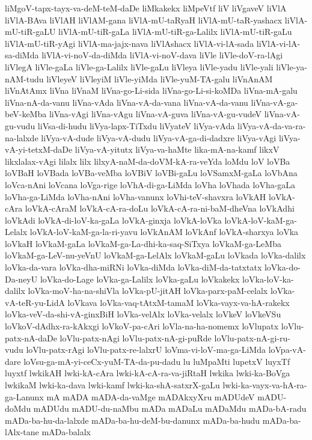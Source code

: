 {liMgoV-tapx-tayx-va-deM-teM-daDe
liMkakekx
liMpeVtf
liV
liVgaveV
liVlA
liVlA-BAva
liVlAH
liVlAM-gana
liVlA-mU-taRyaH
liVlA-mU-taR-yashacx
liVlA-mU-tiR-gaLU
liVlA-mU-tiR-gaLa
liVlA-mU-tiR-ga-Lalilx
liVlA-mU-tiR-gaLu
liVlA-mU-tiR-yAgi
liVlA-ma-jajx-nava
liVlAshacx
liVlA-vi-lA-sada
liVlA-vi-lA-sa-diMda
liVlA-vi-noV-da-diMda
liVlA-vi-noV-dava
liVle
liVle-doV-ra-lAgi
liVlegA
liVle-gaLa
liVle-ga-Lalilx
liVle-gaLu
liVleya
liVle-yadu
liVle-yali
liVle-ya-nAM-tudu
liVleyeV
liVleyiM
liVle-yiMda
liVle-yuM-TA-galu
liVnAnAM
liVnAtAmx
liVna
liVnaM
liVna-go-Li-sida
liVna-go-Li-si-koMDa
liVna-mA-galu
liVna-nA-da-vanu
liVna-vAda
liVna-vA-da-vana
liVna-vA-da-vanu
liVna-vA-ga-beV-keMba
liVna-vAgi
liVna-vAgu
liVna-vA-guva
liVna-vA-gu-vudeV
liVna-vA-gu-vudu
liVsa-di-hudu
liVya-lapx-TiTxdu
liVyateV
liVya-vAda
liVya-vA-da-va-ra-na-lalxde
liVya-vA-dude
liVya-vA-dudu
liVya-vA-ga-di-dadxre
liVya-vAgi
liVya-vA-yi-tetxM-daDe
liVya-vA-yitutx
liVya-va-haMte
lika-mA-na-kamf
likxV
likxlalax-vAgi
lilalx
lilx
lilxyA-naM-da-doVM-kA-ra-veYda
loMdu
loV
loVBa
loVBaH
loVBada
loVBa-veMba
loVBiV
loVBi-gaLu
loVSamxM-gaLa
loVbAna
loVca-nAni
loVcana
loVga-rige
loVhA-di-ga-LiMda
loVha
loVhada
loVha-gaLa
loVha-ga-LiMda
loVha-nAni
loVha-vanunx
loVhi-teV-shavxra
loVkAH
loVkA-cAra
loVkA-cAraM
loVkA-cA-ra-doLu
loVkA-cA-ra-ni-baM-dheVna
loVkAdhi
loVkAdi
loVkA-di-loV-ka-gaLa
loVkA-ginxja
loVkA-loVka
loVkA-loV-kaM-ga-Lelalx
loVkA-loV-kaM-ga-la-ri-yavu
loVkAnAM
loVkAnf
loVkA-sharxya
loVka
loVkaH
loVkaM-gaLa
loVkaM-ga-La-dhi-ka-saq-SiTxya
loVkaM-ga-LeMba
loVkaM-ga-LeV-nu-yeVnU
loVkaM-ga-LelAlx
loVkaM-gaLu
loVkada
loVka-dalilx
loVka-da-vara
loVka-dha-miRNi
loVka-diMda
loVka-diM-da-tatxtatx
loVka-do-Da-neyU
loVka-do-Lage
loVka-ga-Lalilx
loVka-gaLu
loVkakekx
loVka-loV-ka-dalilx
loVka-moV-ha-na-shiVla
loVka-pU-jitAH
loVka-parx-paM-celalx
loVka-vA-teR-yu-LidA
loVkava
loVka-vaq-tAtxM-tamaM
loVka-vayx-va-hA-rakekx
loVka-veV-da-shi-vA-ginxBiH
loVka-velAlx
loVka-velalx
loVkeV
loVkeVSu
loVkoV-dAdhx-ra-kAkxgi
loVkoV-pa-cAri
loVla-na-ha-nomemx
loVlupatx
loVlu-patx-nA-daDe
loVlu-patx-nAgi
loVlu-patx-nA-gi-puRde
loVlu-patx-nA-gi-ru-vudu
loVlu-patx-rAgi
loVlu-patx-re-lalxrU
loVma-vi-loV-ma-ga-LiMda
loVpa-vA-dare
loVsu-ga-mA-yi-ceCx-yuM-TA-da-pu-dadu
lu
luMpaMti
lupetxV
luyxTf
luyxtf
lwkikAH
lwki-kA-cAra
lwki-kA-cA-ra-va-jiRtaH
lwkika
lwki-ka-BoVga
lwkikaM
lwki-ka-dava
lwki-kamf
lwki-ka-shA-satxrX-gaLu
lwki-ka-vayx-va-hA-ra-ga-Lanunx
mA
mADA
mADA-da-vaMge
mADAkxyXru
mADUdeV
mADU-doMdu
mADUdu
mADU-du-naMbu
mADa
mADaLu
mADaMdu
mADa-bA-radu
mADa-ba-hu-da-lalxde
mADa-ba-hu-deM-bu-danunx
mADa-ba-hudu
mADa-ba-lAlx-tane
mADa-balalx
}
